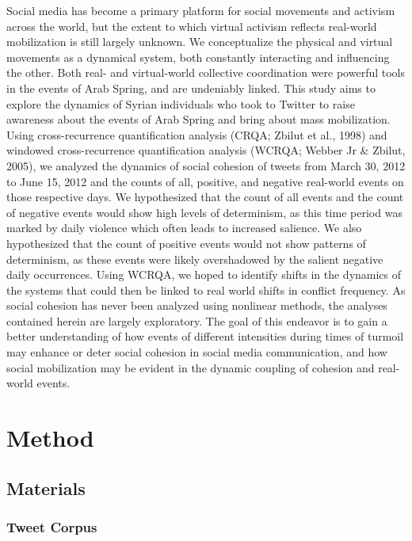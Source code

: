 \documentclass[english,man]{apa6}
\begin{document}
Social media has become a primary platform for social movements and activism across the world, but the extent to which virtual activism reflects real-world mobilization is still largely unknown. We conceptualize the physical and virtual movements as a dynamical system, both constantly interacting and influencing the other. Both real- and virtual-world collective coordination were powerful tools in the events of Arab Spring, and are undeniably linked. This study aims to explore the dynamics of Syrian individuals who took to Twitter to raise awareness about the events of Arab Spring and bring about mass mobilization. Using cross-recurrence quantification analysis (CRQA; Zbilut et al., 1998) and windowed cross-recurrence quantification analysis (WCRQA; Webber Jr \& Zbilut, 2005), we analyzed the dynamics of social cohesion of tweets from March 30, 2012 to June 15, 2012 and the counts of all, positive, and negative real-world events on those respective days. We hypothesized that the count of all events and the count of negative events would show high levels of determinism, as this time period was marked by daily violence which often leads to increased salience. We also hypothesized that the count of positive events would not show patterns of determinism, as these events were likely overshadowed by the salient negative daily occurrences. Using WCRQA, we hoped to identify shifts in the dynamics of the systems that could then be linked to real world shifts in conflict frequency. As social cohesion has never been analyzed using nonlinear methods, the analyses contained herein are largely exploratory. The goal of this endeavor is to gain a better understanding of how events of different intensities during times of turmoil may enhance or deter social cohesion in social media communication, and how social mobilization may be evident in the dynamic coupling of cohesion and real-world events.

\hypertarget{method}{%
\section{Method}\label{method}}

\hypertarget{materials}{%
\subsection{Materials}\label{materials}}

\hypertarget{tweet-corpus}{%
\subsubsection{Tweet Corpus}\label{tweet-corpus}}
\end{document}
